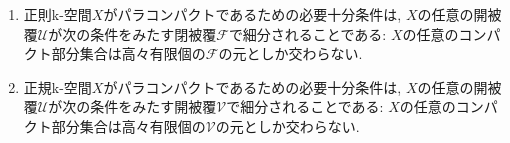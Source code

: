 \documentclass[uplatex, dvipdfmx, a4paper, 12pt, class=jsarticle, crop=false]{standalone}
\begin{document}
\begin{problem}[5.1.B, {\Arhangelski [1965]}]\label{eng-5-1-B-problem}
    \begin{enumerate}
        \item {}正則k-空間\(X\)がパラコンパクトであるための必要十分条件は,
        \(X\)の任意の開被覆\(\mathscr{U}\)が次の条件をみたす閉被覆\(\mathscr{F}\)で細分されることである:
        \(X\)の任意のコンパクト部分集合は高々有限個の\(\mathscr{F}\)の元としか交わらない.

        \item {}正規k-空間\(X\)がパラコンパクトであるための必要十分条件は,
        \(X\)の任意の開被覆\(\mathscr{U}\)が次の条件をみたす開被覆\(\mathscr{V}\)で細分されることである:
        \(X\)の任意のコンパクト部分集合は高々有限個の\(\mathscr{V}\)の元としか交わらない.
    \end{enumerate}
\end{problem}
\end{document}
